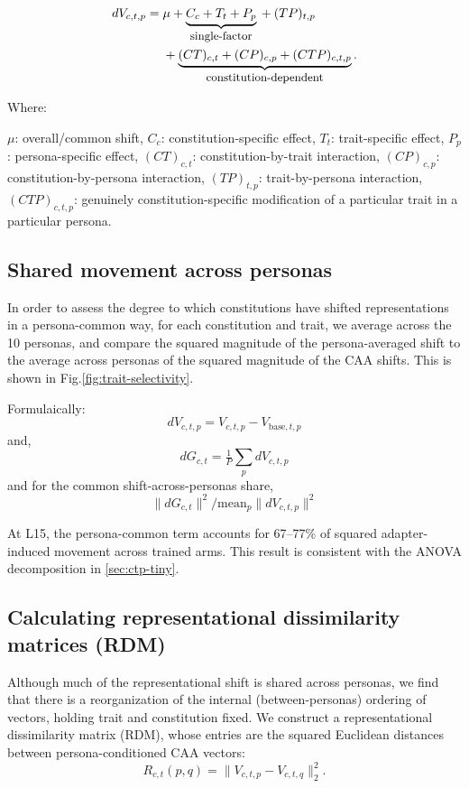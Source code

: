 \documentclass{article}
\begin{document}
\begin{equation}
\begin{aligned}
dV_{c,t,p}
={}&
\mu
+ \underbrace{C_c + T_t + P_p}_{\text{\footnotesize single-factor}}{}
+ (TP)_{t,p}\\
&+ \underbrace{(CT)_{c,t} + (CP)_{c,p} + (CTP)_{c,t,p}}_{\text{\footnotesize constitution-dependent}}.
\end{aligned}
\end{equation}

Where:

$\mu$: overall/common shift, 
\(C_c\): constitution-specific effect, 
\(T_t\): trait-specific effect, 
\(P_p\): persona-specific effect, 
\((CT)_{c,t}\): constitution-by-trait interaction, 
\((CP)_{c,p}\): constitution-by-persona interaction, 
\((TP)_{t,p}\): trait-by-persona interaction, 
\((CTP)_{c,t,p}\): genuinely constitution-specific modification of a particular trait in a particular persona.

\subsection{Shared movement across personas}
\label{app:broad-shift}
In order to assess the degree to which constitutions have shifted representations in a persona-common way, for each constitution and trait, we average across the 10 personas, and compare the squared magnitude of the persona-averaged shift to the average across personas of the squared magnitude of the CAA shifts. This is shown in Fig.\ref{fig:trait-selectivity}.

Formulaically:
\[
dV_{c,t,p} = V_{c,t,p}-V_{\mathrm{base},t,p}
\]
and,
\[
dG_{c,t} = \tfrac{1}{P}\sum_{p}dV_{c,t,p}
\]
and for the common shift-across-personas share,
\[
\|dG_{c,t}\|^2\big/\mathrm{mean}_p\|dV_{c,t,p}\|^2
\]

At L15, the persona-common term accounts for 67--77\% of squared adapter-induced movement across trained arms. This result is consistent with the ANOVA decomposition in \ref{sec:ctp-tiny}.

\subsection{Calculating representational dissimilarity matrices (RDM)}
\label{app:rdm}
Although much of the representational shift is shared across personas, we find that there is a reorganization of the internal (between-personas) ordering of vectors, holding trait and constitution fixed. We construct a representational dissimilarity matrix (RDM), whose entries are the squared
Euclidean distances between persona-conditioned CAA vectors:
\begin{equation}
R_{c,t}(p,q)
=
\|V_{c,t,p}-V_{c,t,q}\|_2^2.
\end{equation}
\end{document}
